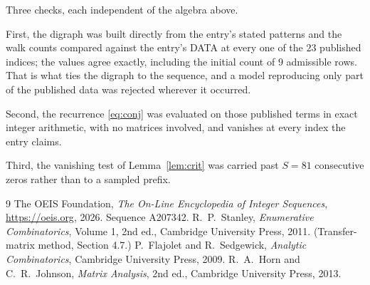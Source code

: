 \documentclass[11pt,a4paper]{article}
\theoremstyle{plain}
\theoremstyle{definition}
\begin{document}
Three checks, each independent of the algebra above.

First, the digraph was built directly from the entry's stated patterns and the walk counts
compared against the entry's DATA at every one of the $23$ published indices; the
values agree exactly, including the initial count of $9$ admissible rows. That is
what ties the digraph to the sequence, and a model reproducing only part of the published
data was rejected wherever it occurred.

Second, the recurrence \eqref{eq:conj} was evaluated on those published terms in exact
integer arithmetic, with no matrices involved, and vanishes at every index the entry claims.

Third, the vanishing test of Lemma~\ref{lem:crit} was carried past $S=81$ consecutive
zeros rather than to a sampled prefix.

\begin{thebibliography}{9}
 The OEIS Foundation, \emph{The On-Line Encyclopedia of Integer
Sequences}, \url{https://oeis.org}, 2026. Sequence A207342.
 R.~P.~Stanley, \emph{Enumerative Combinatorics}, Volume 1, 2nd ed.,
Cambridge University Press, 2011. (Transfer-matrix method, Section 4.7.)
 P.~Flajolet and R.~Sedgewick, \emph{Analytic Combinatorics}, Cambridge
University Press, 2009.
 R.~A.~Horn and C.~R.~Johnson, \emph{Matrix Analysis}, 2nd ed., Cambridge
University Press, 2013.
\end{thebibliography}
\end{document}
